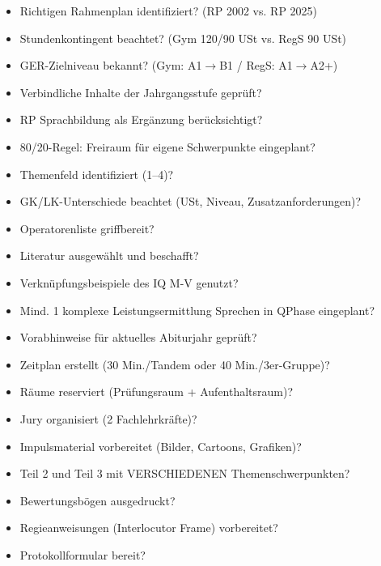 \documentclass[11pt,a4paper]{article}
\newcommand{\checkbox}{$\square$}
\begin{document}
\begin{checklistbox}
\begin{itemize}[leftmargin=0.5cm, label=\checkbox]
\item Richtigen Rahmenplan identifiziert? (RP 2002 vs. RP 2025)
\item Stundenkontingent beachtet? (Gym 120/90 USt vs. RegS 90 USt)
\item GER-Zielniveau bekannt? (Gym: A1$\rightarrow$B1 / RegS: A1$\rightarrow$A2+)
\item Verbindliche Inhalte der Jahrgangsstufe geprüft?
\item RP Sprachbildung als Ergänzung berücksichtigt?
\item 80/20-Regel: Freiraum für eigene Schwerpunkte eingeplant?
\end{itemize}
\end{checklistbox}

\vspace{0.5cm}

\begin{checklistbox}
\begin{itemize}[leftmargin=0.5cm, label=\checkbox]
\item Themenfeld identifiziert (1--4)?
\item GK/LK-Unterschiede beachtet (USt, Niveau, Zusatzanforderungen)?
\item Operatorenliste griffbereit?
\item Literatur ausgewählt und beschafft?
\item Verknüpfungsbeispiele des IQ M-V genutzt?
\item Mind. 1 komplexe Leistungsermittlung Sprechen in QPhase eingeplant?
\item Vorabhinweise für aktuelles Abiturjahr geprüft?
\end{itemize}
\end{checklistbox}

\vspace{0.5cm}

\begin{checklistbox}
\begin{itemize}[leftmargin=0.5cm, label=\checkbox]
\item Zeitplan erstellt (30 Min./Tandem oder 40 Min./3er-Gruppe)?
\item Räume reserviert (Prüfungsraum + Aufenthaltsraum)?
\item Jury organisiert (2 Fachlehrkräfte)?
\item Impulsmaterial vorbereitet (Bilder, Cartoons, Grafiken)?
\item Teil 2 und Teil 3 mit VERSCHIEDENEN Themenschwerpunkten?
\item Bewertungsbögen ausgedruckt?
\item Regieanweisungen (Interlocutor Frame) vorbereitet?
\item Protokollformular bereit?
\end{itemize}
\end{checklistbox}
\end{document}
